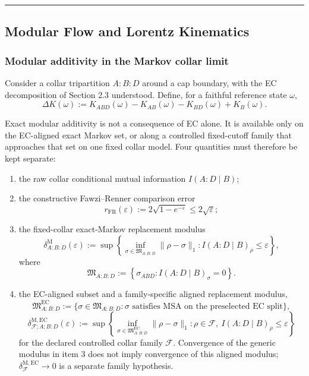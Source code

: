 \begin{center}\rule{0.5\linewidth}{0.5pt}\end{center}
\subsection{Modular Flow and Lorentz Kinematics}\label{4-modular-flow-and-lorentz-kinematics}

\subsubsection{Modular additivity in the Markov collar limit}\label{41-modular-additivity-in-the-markov-collar-limit}

Consider a collar tripartition \(A:B:D\) around a cap boundary, with the EC decomposition of Section 2.3 understood. Define, for a faithful reference state \(\omega\),
\[
\Delta K(\omega)
:=
K_{ABD}(\omega)-K_{AB}(\omega)-K_{BD}(\omega)+K_B(\omega).
\]

Exact modular additivity is not a consequence of EC alone. It is available only on the EC-aligned exact Markov set, or along a controlled fixed-cutoff family that approaches that set on one fixed collar model. Four quantities must therefore be kept separate:
\begin{enumerate}
\item the raw collar conditional mutual information \(I(A:D\mid B)\);
\item the constructive Fawzi--Renner comparison error
\[
r_{\mathrm{FR}}(\varepsilon):=
2\sqrt{1-e^{-\varepsilon}}
\le
2\sqrt{\varepsilon};
\]
\item the fixed-collar exact-Markov replacement modulus
\[
\delta^{\mathrm M}_{A:B:D}(\varepsilon)
:=
\sup\left\{
\inf_{\sigma\in\mathfrak M_{A:B:D}}\|\rho-\sigma\|_1:
I(A:D\mid B)_\rho\le \varepsilon
\right\},
\]
where
\[
\mathfrak M_{A:B:D}
:=
\left\{
\sigma_{ABD}: I(A:D\mid B)_\sigma=0
\right\}.
\]
\item the EC-aligned subset and a family-specific aligned replacement modulus,
\[
\mathfrak M^{\mathrm{EC}}_{A:B:D}
:=
\{\sigma\in\mathfrak M_{A:B:D}:\sigma\text{ satisfies MSA on the preselected EC split}\},
\]
\[
\delta^{\mathrm{M,EC}}_{\mathcal F;A:B:D}(\varepsilon)
:=
\sup\left\{
\inf_{\sigma\in\mathfrak M^{\mathrm{EC}}_{A:B:D}}\|\rho-\sigma\|_1:
\rho\in\mathcal F,\ I(A:D\mid B)_\rho\le\varepsilon
\right\}
\]
for the declared controlled collar family \(\mathcal F\). Convergence of the
generic modulus in item 3 does not imply convergence of this aligned modulus;
\(\delta^{\mathrm{M,EC}}_{\mathcal F}\to0\) is a separate family hypothesis.
\end{enumerate}

